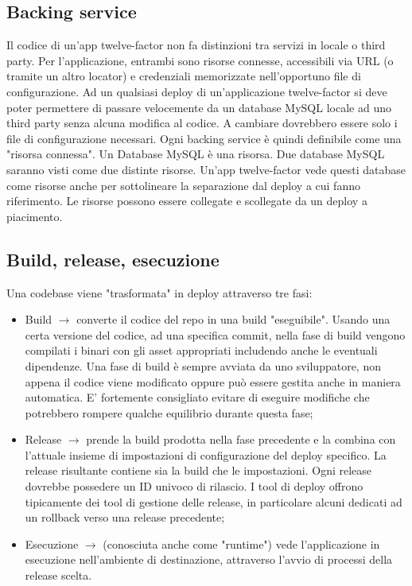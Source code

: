 \documentclass[PianoDiQualifica.tex]{subfiles}
\begin{document}
\subsection{Backing service}
Il codice di un'app twelve-factor non fa distinzioni tra servizi in locale o third party. Per l'applicazione, entrambi sono risorse connesse, accessibili via URL (o tramite un altro locator) e credenziali memorizzate nell'opportuno file di configurazione. Ad un qualsiasi deploy di un'applicazione twelve-factor si deve poter permettere di passare velocemente da un database MySQL locale ad uno third party senza alcuna modifica al codice. A cambiare dovrebbero essere solo i file di configurazione necessari.
Ogni backing service è quindi definibile come una "risorsa connessa". Un Database MySQL è una risorsa. Due database MySQL saranno visti come due distinte risorse. Un'app twelve-factor vede questi database come risorse anche per sottolineare la separazione dal deploy a cui fanno riferimento. Le risorse possono essere collegate e scollegate da un deploy a piacimento.

\subsection{Build, release, esecuzione}
Una codebase viene "trasformata" in deploy attraverso tre fasi:
\begin{itemize}
\item Build $\rightarrow$ converte il codice del repo in una build "eseguibile". Usando una certa versione del codice, ad una specifica commit, nella fase di build vengono compilati i binari con gli asset appropriati includendo anche le eventuali dipendenze. Una fase di build è sempre avviata da uno sviluppatore, non appena il codice viene modificato oppure può essere gestita anche in maniera automatica. E' fortemente consigliato evitare di eseguire modifiche che potrebbero rompere qualche equilibrio durante questa fase;
\item Release $\rightarrow$ prende la build prodotta nella fase precedente e la combina con l'attuale insieme di impostazioni di configurazione del deploy specifico. La release risultante contiene sia la build che le impostazioni. Ogni release dovrebbe possedere un ID univoco di rilascio. I tool di deploy offrono tipicamente dei tool di gestione delle release, in particolare alcuni dedicati ad un rollback verso una release precedente;
\item Esecuzione $\rightarrow$ (conosciuta anche come "runtime") vede l'applicazione in esecuzione nell'ambiente di destinazione, attraverso l'avvio di processi della release scelta.
\end{itemize}
\end{document}
